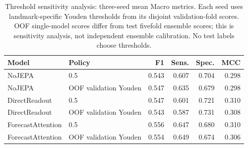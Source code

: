 \begin{table}[t]
\centering
\small
\caption{Threshold sensitivity analysis: three-seed mean Macro metrics. Each seed uses landmark-specific Youden thresholds from its disjoint validation-fold scores. OOF single-model scores differ from test fivefold ensemble scores; this is sensitivity analysis, not independent ensemble calibration. No test labels choose thresholds.}
\label{tab:extended_threshold}
\begin{tabular}{llrrrr}
\toprule
Model & Policy & F1 & Sens. & Spec. & MCC \\
\midrule
NoJEPA & 0.5 & 0.543 & 0.607 & 0.704 & 0.298 \\
NoJEPA & OOF validation Youden & 0.547 & 0.635 & 0.679 & 0.298 \\
\midrule
DirectReadout & 0.5 & 0.547 & 0.601 & 0.721 & 0.310 \\
DirectReadout & OOF validation Youden & 0.543 & 0.587 & 0.731 & 0.308 \\
\midrule
ForecastAttention & 0.5 & 0.556 & 0.647 & 0.680 & 0.310 \\
ForecastAttention & OOF validation Youden & 0.554 & 0.649 & 0.674 & 0.306 \\
\bottomrule
\end{tabular}
\end{table}
